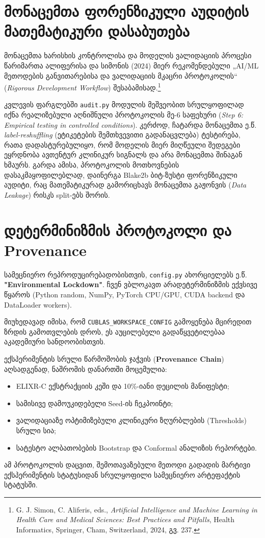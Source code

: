 \documentclass[12pt,a4paper,oneside]{report}
\begin{document}
\section{მონაცემთა ფორენზიკული აუდიტის მათემატიკური დასაბუთება}
მონაცემთა ხარისხის კონტროლისა და მოდელის ვალიდაციის პროცესი წარიმართა ალიფერისა და სიმონის (2024) მიერ რეკომენდებული „AI/ML მეთოდების განვითარებისა და ვალიდაციის მკაცრი პროტოკოლის“ (\textit{Rigorous Development Workflow}) შესაბამისად.\footnote{G. J. Simon, C. Aliferis, eds., \textit{Artificial Intelligence and Machine Learning in Health Care and Medical Sciences: Best Practices and Pitfalls}, Health Informatics, Springer, Cham, Switzerland, 2024, გვ. 237.}

კვლევის ფარგლებში \texttt{audit.py} მოდულის მეშვეობით სრულყოფილად იქნა რეალიზებული აღნიშნული პროტოკოლის მე-6 საფეხური (\textit{Step 6: Empirical testing in controlled conditions}). კერძოდ, ჩატარდა მონაცემთა ე.წ. \textit{label-reshuffling} (ეტიკეტების შემთხვევითი გადანაცვლება) ტესტირება, რათა დადასტურებულიყო, რომ მოდელის მიერ მიღწეული შედეგები ეყრდნობა ავთენტურ კლინიკურ სიგნალს და არა მონაცემთა შინაგან ხმაურს. გარდა ამისა, პროტოკოლის მოთხოვნების დასაკმაყოფილებლად, დაინერგა Blake2b ბიტ-ზუსტი ფორენზიკული აუდიტი, რაც მათემატიკურად გამორიცხავს მონაცემთა გაჟონვის (\textit{Data Leakage}) რისკს split-ებს შორის.

\section{დეტერმინიზმის პროტოკოლი და Provenance}
სამეცნიერო რეპროდუცირებადობისთვის, \texttt{config.py} ახორციელებს ე.წ. \textbf{"Environmental Lockdown"}. ჩვენ ვბლოკავთ არადეტერმინიზმის ექვსივე წყაროს (Python random, NumPy, PyTorch CPU/GPU, CUDA backend და DataLoader workers). 

მიუხედავად იმისა, რომ \texttt{CUBLAS\_WORKSPACE\_CONFIG} გამოყენება მცირედით ზრდის გამოთვლების დროს, ეს აუცილებელი გადაწყვეტილებაა აკადემიური სანდოობისთვის.

ექსპერიმენტის სრული წარმოშობის ჯაჭვის (\textbf{Provenance Chain}) აღსადგენად, ნაშრომის დანართში მოცემულია:
\begin{itemize}
    \item ELIXR-C ექსტრაქციის კეში და 10\%-იანი დეცილის მანიფესტი;
    \item სამისივე დამოუკიდებელი Seed-ის ჩეკპოინტი;
    \item ვალიდაციაზე ოპტიმიზებული კლინიკური ზღურბლების (Thresholds) სრული სია;
    \item სატესტო ალბათობების Bootstrap და Conformal ანალიზის რეპორტები.
\end{itemize}
ამ პროტოკოლის დაცვით, შემოთავაზებული მეთოდი გადადის მარტივი ექსპერიმენტის სტატუსიდან სრულყოფილი სამეცნიერო არტეფაქტის სტატუსში.
\end{document}
